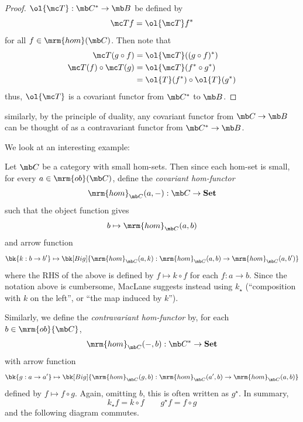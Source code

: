 \documentclass{fkbook}
\newcommand{\ob}{\mrm{ob}}
\newcommand{\homm}{\mrm{hom}}
\begin{document}
\begin{adjustwidth}{1em}{1em}
\begin{proof}
    $\ol{\mc T} : \mb C^* \to \mb B$ be defined by
    \[
      \mc T f = \ol{\mc T} f^*
    \]
    for all $f \in \homm(\mb C)$. Then note that
    \begin{align*}
      \mc T(g \circ f)
      &= \ol{\mc T} ((g \circ f)^*) \\
      \mc T(f) \circ \mc T(g)
      &= \ol{\mc T} (f^* \circ g^*) \\
      &= \ol{T}(f^*) \circ \ol{T}(g^*)
    \end{align*}
    thus, $\ol{\mc T}$ is a covariant functor from $\mb C^*$ to $\mb
    B$.
  \end{proof}
  similarly, by the principle of duality, any covariant functor from
  $\mb C \to \mb B$ can be thought of as a contravariant functor from
  $\mb C^* \to \mb B$.

  We look at an interesting example:
  \begin{definition}
    Let $\mb C$ be a category with small hom-sets. Then since each
    hom-set is small, for every $a \in \ob(\mb C)$, define the
    \emph{covariant hom-functor}
    \[
      \homm_{\mb C}(a, -): \mb C \to \textbf{Set}
    \]
    such that the object function gives
    \[
      b \mapsto \homm_{\mb C}(a,b)
    \]
    and arrow function
    \[
      \bk{k : b \to b'} \mapsto \bk[Big]{\homm_{\mb C}(a,k) :
        \homm_{\mb C}(a,b) \to \homm_{\mb C}(a, b')}
    \]
    where the RHS of the above is defined by $f \mapsto k \circ f$ for
    each $f : a \to b$. Since the notation above is cumbersome,
    MacLane suggests instead using $k_\star$ (``composition with $k$ on
    the left'', or ``the map induced by $k$'').

    Similarly, we define the \emph{contravariant hom-functor} by, for
    each $b \in \ob{\mb C}$,
    \[
      \homm_{\mb C}(-,b) : \mb C^* \to \textbf{Set}
    \]
    with arrow function
    \[
      \bk{g : a \to a'} \mapsto \bk[Big]{\homm_{\mb C}(g, b) :
        \homm_{\mb C}(a',b) \to \homm_{\mb C}(a, b)}
    \]
    defined by $f \mapsto f \circ g$. Again, omitting $b$, this is
    often written as $g^\star$. In summary,
    \[
      k_\star f = k \circ f \qquad g^\star f = f \circ g
    \]
    and the following diagram commutes.
    \begin{figure}[H]
      \centering
      \tikzset{node distance=3cm, auto}
    \end{figure}
  \end{definition}


\end{adjustwidth}
\end{document}
